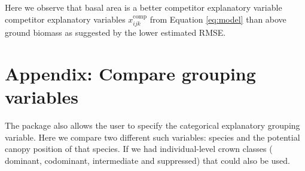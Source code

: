 \documentclass[12pt]{article}
\begin{document}
Here we observe that basal area is a better competitor explanatory
variable competitor explanatory variables \(x^{\text{comp}}_{ijk}\) from
Equation \ref{eq:model} than above ground biomass as suggested by the
lower estimated RMSE.

\hypertarget{compare-group-var}{%
\section{Appendix: Compare grouping variables}\label{compare-group-var}}

The package also allows the user to specify the categorical explanatory
grouping variable. Here we compare two different such variables: species
and the potential canopy position of that species. If we had
individual-level crown classes (\citet{smith_practice_1986} dominant,
codominant, intermediate and suppressed) that could also be used.
\end{document}

